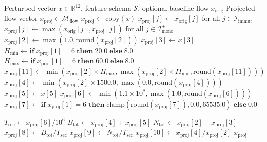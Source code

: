 \begin{algorithm}[!t]
\footnotesize\linespread{1}\selectfont
\caption{Analytical Manifold Projection Operator $\mathcal{P}_{\mathcal{M}}$}
\label{alg:manifold_proj}
\begin{algorithmic}[1]
\REQUIRE Perturbed vector $x \in \mathbb{R}^{12}$, feature schema $\mathcal{S}$, optional baseline flow $x_{\text{orig}}$
\ENSURE Projected flow vector $x_{\text{proj}} \in \mathcal{M}_{\text{flow}}$
\STATE $x_{\text{proj}} \leftarrow \text{copy}(x)$
    \STATE $x_{\text{proj}}[j] \leftarrow x_{\text{orig}}[j]$ for all $j \in \mathcal{I}_{\text{immut}}$ 
    \STATE $x_{\text{proj}}[j] \leftarrow \max(x_{\text{orig}}[j], x_{\text{proj}}[j])$ for all $j \in \mathcal{I}_{\text{mono}}^+$ 
\ENDIF
\STATE {}
\STATE $x_{\text{proj}}[2] \leftarrow \max(1.0, \text{round}(x_{\text{proj}}[2]))$ 
\STATE $x_{\text{proj}}[3] \leftarrow x[3]$ 
\STATE $H_{\text{min}} \leftarrow \mathbf{if}\; x_{\text{proj}}[1] = 6 \;\mathbf{then}\; 20.0 \;\mathbf{else}\; 8.0$ 
\STATE $H_{\text{max}} \leftarrow \mathbf{if}\; x_{\text{proj}}[1] = 6 \;\mathbf{then}\; 60.0 \;\mathbf{else}\; 8.0$ 
\STATE $x_{\text{proj}}[11] \leftarrow \min(x_{\text{proj}}[2] \times H_{\text{max}}, \max(x_{\text{proj}}[2] \times H_{\text{min}}, \text{round}(x_{\text{proj}}[11])))$ 
\STATE $x_{\text{proj}}[4] \leftarrow \min(x_{\text{proj}}[2] \times 1500.0, \max(0.0, \text{round}(x_{\text{proj}}[4])))$ 
\STATE $x_{\text{proj}}[5] \leftarrow x[5]$ 
\STATE $x_{\text{proj}}[6] \leftarrow \min(1.1 \times 10^8, \max(1.0, \text{round}(x_{\text{proj}}[6])))$ 
\STATE $x_{\text{proj}}[7] \leftarrow \mathbf{if}\; x_{\text{proj}}[1] = 6 \;\mathbf{then}\; \text{clamp}(\text{round}(x_{\text{proj}}[7]), 0.0, 65535.0) \;\mathbf{else}\; 0.0$ 

\STATE {}
\STATE $T_{\text{sec}} \leftarrow x_{\text{proj}}[6] / 10^6$
\STATE $B_{\text{tot}} \leftarrow x_{\text{proj}}[4] + x_{\text{proj}}[5]$
\STATE $N_{\text{tot}} \leftarrow x_{\text{proj}}[2] + x_{\text{proj}}[3]$
\STATE $x_{\text{proj}}[8] \leftarrow B_{\text{tot}} / T_{\text{sec}}$ 
\STATE $x_{\text{proj}}[9] \leftarrow N_{\text{tot}} / T_{\text{sec}}$ 
\STATE $x_{\text{proj}}[10] \leftarrow x_{\text{proj}}[4] / x_{\text{proj}}[2]$ 
\RETURN $x_{\text{proj}}$
\end{algorithmic}
\end{algorithm}

